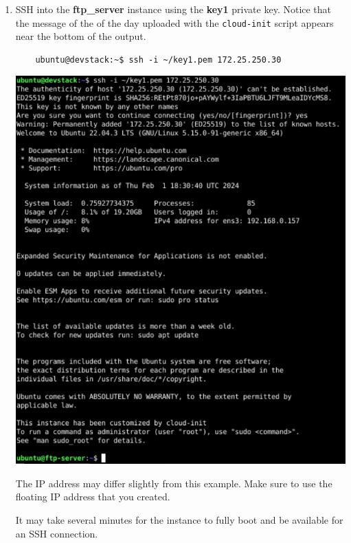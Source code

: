 \documentclass[letterpaper, 12pt]{article}
\begin{document}
\begin{enumerate}
    \item SSH into the \textbf{ftp\_server} instance using the \textbf{key1} private key. Notice that the message of the
    of the day uploaded with the \texttt{cloud-init} script appears near the bottom of the output.
    \begin{lstlisting}
    ubuntu@devstack:~$ ssh -i ~/key1.pem 172.25.250.30
    \end{lstlisting}

    \begin{center}
        \includegraphics[width=\linewidth]{images/part1/step41.png}
    \end{center}

    \begin{notebox}
        The IP address may differ slightly from this example. Make sure to use the floating IP address that you created.
    \end{notebox}

    \begin{notebox}
        It may take several minutes for the instance to fully boot and be available for an SSH connection.
    \end{notebox}


\end{enumerate}
\end{document}
